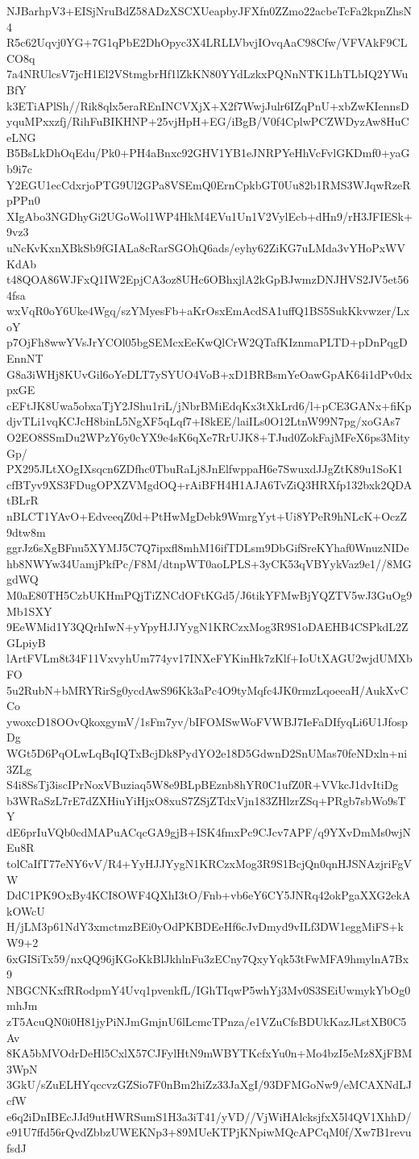 NJBarhpV3+EISjNruBdZ58ADzXSCXUeapbyJFXfn0ZZmo22acbeTcFa2kpnZhsN4
R5c62Uqvj0YG+7G1qPbE2DhOpyc3X4LRLLVbvjIOvqAaC98Cfw/VFVAkF9CLCO8q
7a4NRUlcsV7jcH1El2VStmgbrHf1lZkKN80YYdLzkxPQNnNTK1LhTLbIQ2YWuBfY
k3ETiAPlSh//Rik8qlx5eraREnINCVXjX+X2f7WwjJulr6IZqPnU+xbZwKIennsD
yquMPxxzfj/RihFuBIKHNP+25vjHpH+EG/iBgB/V0f4CplwPCZWDyzAw8HuCeLNG
B5BsLkDhOqEdu/Pk0+PH4aBnxc92GHV1YB1eJNRPYeHhVcFvlGKDmf0+yaGb9i7c
Y2EGU1ecCdxrjoPTG9Ul2GPa8VSEmQ0ErnCpkbGT0Uu82b1RMS3WJqwRzeRpPPn0
XIgAbo3NGDhyGi2UGoWol1WP4HkM4EVu1Un1V2VylEcb+dHn9/rH3JFIESk+9vz3
uNcKvKxnXBkSb9fGIALa8cRarSGOhQ6ads/eyhy62ZiKG7uLMda3vYHoPxWVKdAb
t48QOA86WJFxQ1IW2EpjCA3oz8UHc6OBhxjlA2kGpBJwmzDNJHVS2JV5et564fsa
wxVqR0oY6Uke4Wgq/szYMyesFb+aKrOsxEmAcdSA1uffQ1BS5SukKkvwzer/LxoY
p7OjFh8wwYVsJrYCOl05bgSEMcxEeKwQlCrW2QTafKIznmaPLTD+pDnPqgDEnnNT
G8a3iWHj8KUvGil6oYeDLT7ySYUO4VoB+xD1BRBsmYeOawGpAK64i1dPv0dxpxGE
cEFtJK8Uwa5obxaTjY2JShu1riL/jNbrBMiEdqKx3tXkLrd6/l+pCE3GANx+fiKp
djvTLi1vqKCJcH8binL5NgXF5qLqf7+I8kEE/laiILs0O12LtnW99N7pg/xoGAs7
O2EO8SSmDu2WPzY6y0cYX9e4sK6qXe7RrUJK8+TJud0ZokFajMFeX6ps3MityGp/
PX295JLtXOgIXsqcn6ZDfhc0TbuRaLj8JnElfwppaH6e7SwuxdJJgZtK89u1SoK1
cfBTyv9XS3FDugOPXZVMgdOQ+rAiBFH4H1AJA6TvZiQ3HRXfp132bxk2QDAtBLrR
nBLCT1YAvO+EdveeqZ0d+PtHwMgDebk9WmrgYyt+Ui8YPeR9hNLcK+OczZ9dtw8m
ggrJz6sXgBFnu5XYMJ5C7Q7ipxfl8mhM16ifTDLsm9DbGifSreKYhaf0WnuzNIDe
hb8NWYw34UamjPkfPc/F8M/dtnpWT0aoLPLS+3yCK53qVBYykVaz9e1//8MGgdWQ
M0aE80TH5CzbUKHmPQjTiZNCdOFtKGd5/J6tikYFMwBjYQZTV5wJ3GuOg9Mb1SXY
9EeWMid1Y3QQrhIwN+yYpyHJJYygN1KRCzxMog3R9S1oDAEHB4CSPkdL2ZGLpiyB
lArtFVLm8t34F11VxvyhUm774yv17INXeFYKinHk7zKlf+IoUtXAGU2wjdUMXbFO
5u2RubN+bMRYRirSg0ycdAwS96Kk3aPc4O9tyMqfc4JK0rmzLqoeeaH/AukXvCCo
ywoxcD18OOvQkoxgymV/1sFm7yv/bIFOMSwWoFVWBJ7IeFaDIfyqLi6U1JfospDg
WGt5D6PqOLwLqBqIQTxBcjDk8PydYO2e18D5GdwnD2SnUMas70feNDxln+ni3ZLg
S4i8SsTj3iscIPrNoxVBuziaq5W8e9BLpBEznb8hYR0C1ufZ0R+VVkcJ1dvItiDg
b3WRaSzL7rE7dZXHiuYiHjxO8xuS7ZSjZTdxVjn183ZHlzrZSq+PRgb7sbWo9sTY
dE6prIuVQb0cdMAPuACqcGA9gjB+ISK4fmxPc9CJcv7APF/q9YXvDmMs0wjNEu8R
tolCaIfT77eNY6vV/R4+YyHJJYygN1KRCzxMog3R9S1BcjQn0qnHJSNAzjriFgVW
DdC1PK9OxBy4KCI8OWF4QXhI3tO/Fnb+vb6eY6CY5JNRq42okPgaXXG2ekAkOWcU
H/jLM3p61NdY3xmctmzBEi0yOdPKBDEeHf6cJvDmyd9vILf3DW1eggMiFS+kW9+2
6xGISiTx59/nxQQ96jKGoKkBlJkhlnFu3zECny7QxyYqk53tFwMFA9hmylnA7Bx9
NBGCNKxfRRodpmY4Uvq1pvenkfL/IGhTIqwP5whYj3Mv0S3SEiUwmykYbOg0mhJm
zT5AcuQN0i0H81jyPiNJmGmjnU6lLcmcTPnza/e1VZuCfsBDUkKazJLstXB0C5Av
8KA5bMVOdrDeHl5CxlX57CJFylHtN9mWBYTKcfxYu0n+Mo4bzI5eMz8XjFBM3WpN
3GkU/sZuELHYqccvzGZSio7F0nBm2hiZz33JaXgI/93DFMGoNw9/eMCAXNdLJcfW
e6q2iDnIBEcJJd9utHWRSumS1H3a3iT41/yVD//VjWiHAlcksjfxX5l4QV1XhhD/
e91U7ffd56rQvdZbbzUWEKNp3+89MUeKTPjKNpiwMQcAPCqM0f/Xw7B1revufsdJ
